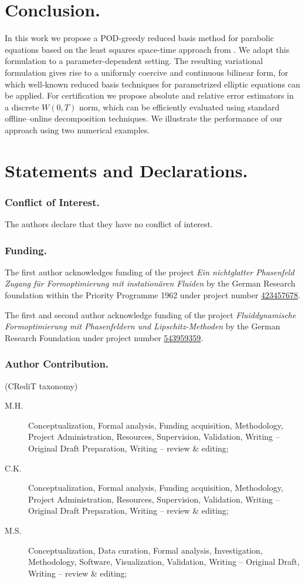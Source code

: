 \documentclass{article}
\theoremstyle{plain}
\theoremstyle{definition}
\theoremstyle{remark}
\begin{document}
\section{Conclusion.}
In this work we propose a POD-greedy reduced basis method for parabolic equations based on the least squares space-time approach from \cite{preprint_SP}. We adapt this formulation to a parameter-dependent setting. The resulting variational formulation gives rise to a uniformly coercive and continuous bilinear form, for which well-known reduced basis techniques for parametrized elliptic equations can be applied. For certification we propose absolute and relative error estimators in a discrete $W(0,T)$ norm, which can be efficiently evaluated using standard offline–online decomposition techniques. We illustrate the performance of our approach using two numerical examples.


\section*{Statements and Declarations.}

\subsubsection*{Conflict of Interest.}
The authors declare that they have no conflict of interest.

\subsubsection*{Funding.} 
The first author acknowledges funding of the project \textit{Ein nichtglatter Phasenfeld Zugang für Formoptimierung mit instationären Fluiden} by the German Research foundation within the Priority Programme 1962 under project number \href{https://gepris.dfg.de/gepris/projekt/423457678}{423457678}.

The first and second author acknowledge funding of the project \textit{Fluiddynamische Formoptimierung mit Phasenfeldern und Lipschitz-Methoden} by the German Research Foundation under project number \href{https://gepris.dfg.de/gepris/projekt/543959359}{543959359}.


\subsubsection*{Author Contribution.}
(CRediT taxonomy)
\begin{description}
    \item [M.H.] Conceptualization, Formal analysis, Funding acquisition, Methodology, Project Administration, Resources, Supervision, Validation, Writing – Original Draft Preparation, Writing – review \& editing;
    \item [C.K.] Conceptualization, Formal analysis, Funding acquisition, Methodology, Project Administration, Resources, Supervision, Validation, Writing – Original Draft Preparation, Writing – review \& editing;
    \item [M.S.] Conceptualization, Data curation, Formal analysis, Investigation, Methodology, Software, Visualization,  Validation, Writing – Original Draft, Writing – review \& editing;
\end{description}


\printbibliography
\end{document}
